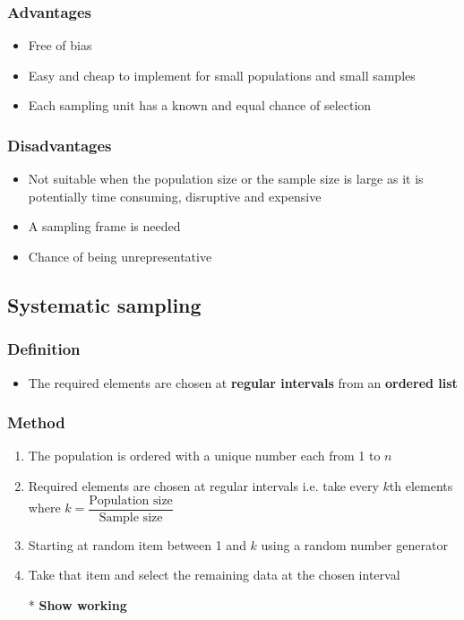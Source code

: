 \subsubsection{Advantages}
\begin{itemize}
	\item Free of bias
	\item Easy and cheap to implement for small populations and small samples
	\item Each sampling unit has a known and equal chance of selection
\end{itemize}
\subsubsection{Disadvantages}
\begin{itemize}
	\item Not suitable when the population size or the sample size is large as it is potentially time consuming, disruptive and expensive
	\item A sampling frame is needed
	\item Chance of being unrepresentative
\end{itemize}
\subsection{Systematic sampling}
\subsubsection{Definition}
\begin{itemize}
	\item The required elements are chosen at \textbf{regular intervals} from an \textbf{ordered list}
\end{itemize}
\subsubsection{Method}
\begin{enumerate}
	\item The population is ordered with a unique number each from 1 to $n$
	\item Required elements are chosen at regular intervals i.e. take every $k$th elements where $k=\dfrac{\text{Population size}}{\text{Sample size}}$
	\item Starting at random item between 1 and $k$ using a random number generator
	\item Take that item and select the remaining data at the chosen interval
	\item[*] \textbf{Show working}
\end{enumerate}
